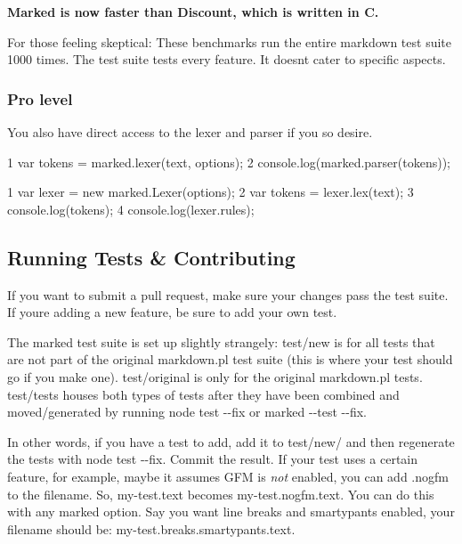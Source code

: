 {\bfseries Marked is now faster than Discount, which is written in C.}

For those feeling skeptical\+: These benchmarks run the entire markdown test suite 1000 times. The test suite tests every feature. It doesn\textquotesingle{}t cater to specific aspects.

\subsubsection*{Pro level}

You also have direct access to the lexer and parser if you so desire.


\begin{DoxyCode}
1 var tokens = marked.lexer(text, options);
2 console.log(marked.parser(tokens));
\end{DoxyCode}



\begin{DoxyCode}
1 var lexer = new marked.Lexer(options);
2 var tokens = lexer.lex(text);
3 console.log(tokens);
4 console.log(lexer.rules);
\end{DoxyCode}





\subsection*{Running Tests \& Contributing}

If you want to submit a pull request, make sure your changes pass the test suite. If you\textquotesingle{}re adding a new feature, be sure to add your own test.

The marked test suite is set up slightly strangely\+: {\ttfamily test/new} is for all tests that are not part of the original markdown.\+pl test suite (this is where your test should go if you make one). {\ttfamily test/original} is only for the original markdown.\+pl tests. {\ttfamily test/tests} houses both types of tests after they have been combined and moved/generated by running {\ttfamily node test -\/-\/fix} or {\ttfamily marked -\/-\/test -\/-\/fix}.

In other words, if you have a test to add, add it to {\ttfamily test/new/} and then regenerate the tests with {\ttfamily node test -\/-\/fix}. Commit the result. If your test uses a certain feature, for example, maybe it assumes G\+F\+M is {\itshape not} enabled, you can add {\ttfamily .nogfm} to the filename. So, {\ttfamily my-\/test.\+text} becomes {\ttfamily my-\/test.\+nogfm.\+text}. You can do this with any marked option. Say you want line breaks and smartypants enabled, your filename should be\+: {\ttfamily my-\/test.\+breaks.\+smartypants.\+text}.

